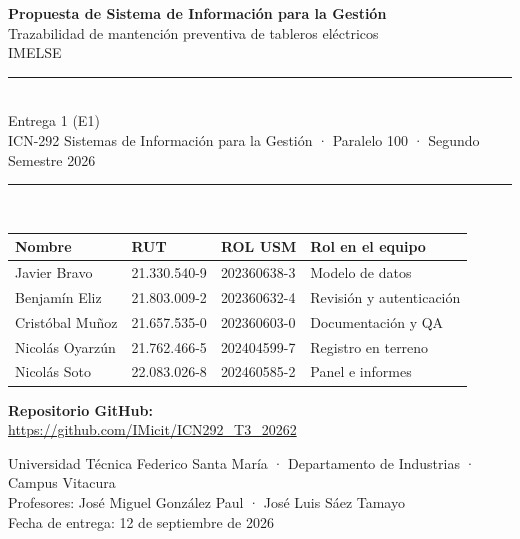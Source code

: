 \documentclass[10pt,letterpaper]{article}
\newcommand{\repo}{https://github.com/IMicit/ICN292\_T3\_20262}
\begin{document}
\begin{titlepage}
\centering
\vspace*{2cm}

{\Large\bfseries Propuesta de Sistema de Información para la Gestión}\\[0.4cm]
{\Large Trazabilidad de mantención preventiva de tableros eléctricos}\\[0.3cm]
{\large IMELSE}\\[1.5cm]

\rule{\textwidth}{0.8pt}\\[0.4cm]
{\large Entrega 1 (E1)}\\[0.2cm]
{\normalsize ICN-292 Sistemas de Información para la Gestión · Paralelo 100 · Segundo Semestre 2026}\\[0.2cm]
\rule{\textwidth}{0.8pt}\\[1.5cm]

\begin{tabular}{@{}llll@{}}
\toprule
\textbf{Nombre} & \textbf{RUT} & \textbf{ROL USM} & \textbf{Rol en el equipo} \\
\midrule
Javier Bravo    & 21.330.540-9 & 202360638-3 & Modelo de datos \\
Benjamín Eliz   & 21.803.009-2 & 202360632-4 & Revisión y autenticación \\
Cristóbal Muñoz & 21.657.535-0 & 202360603-0 & Documentación y QA \\
Nicolás Oyarzún & 21.762.466-5 & 202404599-7 & Registro en terreno \\
Nicolás Soto & 22.083.026-8 & 202460585-2 & Panel e informes \\
\bottomrule
\end{tabular}

\vspace{1.2cm}
\textbf{Repositorio GitHub:}\\
\url{\repo}

\vfill
{\small Universidad Técnica Federico Santa María · Departamento de Industrias · Campus Vitacura\\
Profesores: José Miguel González Paul · José Luis Sáez Tamayo\\
Fecha de entrega: 12 de septiembre de 2026}
\end{titlepage}

\tableofcontents
\newpage

\end{document}
